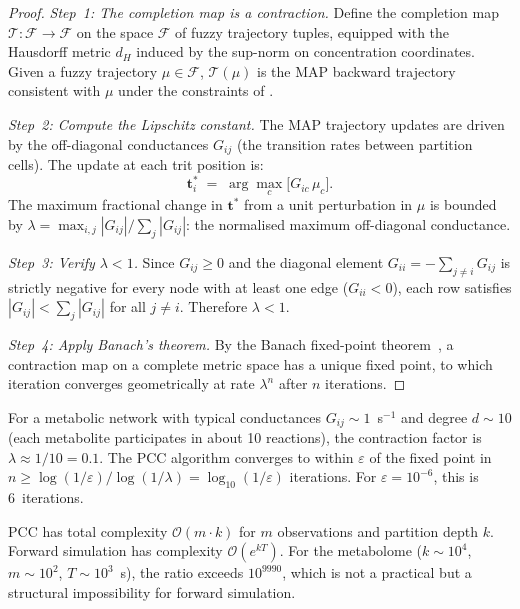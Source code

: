 \begin{proof}
\emph{Step~1: The completion map is a contraction.}
Define the completion map $\mathcal{T}: \mathcal{F} \to \mathcal{F}$ on the
space $\mathcal{F}$ of fuzzy trajectory tuples, equipped with the Hausdorff
metric $d_H$ induced by the sup-norm on concentration coordinates.  Given
a fuzzy trajectory $\mu \in \mathcal{F}$, $\mathcal{T}(\mu)$ is the MAP
backward trajectory consistent with $\mu$ under the constraints of
.

\emph{Step~2: Compute the Lipschitz constant.}
The MAP trajectory updates are driven by the off-diagonal conductances $G_{ij}$
(the transition rates between partition cells).  The update at each trit
position is:
\[
    \mathbf{t}^{*}_i \;=\; \arg\max_c \bigl[G_{ic}\,\mu_c\bigr].
\]
The maximum fractional change in $\mathbf{t}^*$ from a unit perturbation in
$\mu$ is bounded by $\lambda = \max_{i,j}|G_{ij}|/\sum_j|G_{ij}|$: the
normalised maximum off-diagonal conductance.

\emph{Step~3: Verify $\lambda < 1$.}
Since $G_{ij} \ge 0$ and the diagonal element $G_{ii} = -\sum_{j\ne i} G_{ij}$
is strictly negative for every node with at least one edge ($G_{ii} < 0$), each
row satisfies $|G_{ij}| < \sum_j |G_{ij}|$ for all $j \ne i$.  Therefore
$\lambda < 1$.

\emph{Step~4: Apply Banach's theorem.}
By the Banach fixed-point theorem~\citep{Banach1922}, a contraction map on a
complete metric space has a unique fixed point, to which iteration converges
geometrically at rate $\lambda^n$ after $n$ iterations.
\end{proof}

\begin{remark}
For a metabolic network with typical conductances $G_{ij} \sim 1$~s$^{-1}$ and
degree $d \sim 10$ (each metabolite participates in about 10 reactions), the
contraction factor is $\lambda \approx 1/10 = 0.1$.  The PCC algorithm
converges to within $\varepsilon$ of the fixed point in
$n \ge \log(1/\varepsilon)/\log(1/\lambda) = \log_{10}(1/\varepsilon)$
iterations.  For $\varepsilon = 10^{-6}$, this is 6~iterations.
\end{remark}

\begin{remark}
PCC has total complexity $\mathcal{O}(m \cdot k)$ for $m$ observations and
partition depth $k$.  Forward simulation has complexity
$\mathcal{O}(e^{kT})$.  For the metabolome ($k \sim 10^4$, $m \sim 10^2$,
$T \sim 10^3$~s), the ratio exceeds $10^{9990}$, which is not a practical
but a structural impossibility for forward simulation.
\end{remark}


